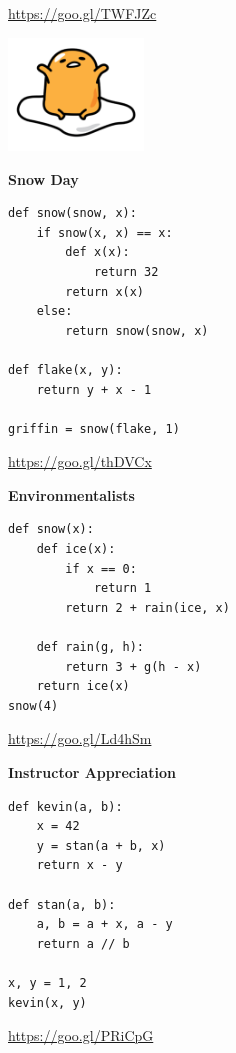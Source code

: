 \documentclass{exam}
\begin{document}
\begin{questions}
\begin{solution}
\url{https://goo.gl/TWFJZc}
\end{solution}

\vspace{7in}
\includegraphics[height=3cm]{env-diagram-party/gudetama.png}

\newpage

\item \textbf{Snow Day}
\begin{lstlisting}
def snow(snow, x):
    if snow(x, x) == x:
        def x(x):
            return 32
        return x(x)
    else:
        return snow(snow, x)
    
def flake(x, y):
    return y + x - 1
    
griffin = snow(flake, 1)
\end{lstlisting}
\ifprintanswers\else
\fi

\begin{solution}
\url{https://goo.gl/thDVCx}
\end{solution}

\newpage

\item \textbf{Environmentalists}
\begin{lstlisting}
def snow(x):
    def ice(x):
        if x == 0:
            return 1
        return 2 + rain(ice, x)

    def rain(g, h):
        return 3 + g(h - x)
    return ice(x)
snow(4)
\end{lstlisting}
\ifprintanswers\else
\fi

\begin{solution}
\url{https://goo.gl/Ld4hSm}
\end{solution}

\newpage

\item \textbf{Instructor Appreciation}
\begin{lstlisting}
def kevin(a, b):
    x = 42
    y = stan(a + b, x)
    return x - y

def stan(a, b):
    a, b = a + x, a - y
    return a // b

x, y = 1, 2
kevin(x, y)
\end{lstlisting}
\ifprintanswers\else
\fi

\begin{solution}
\url{https://goo.gl/PRiCpG}
\end{solution}

\end{questions}
\end{document}
